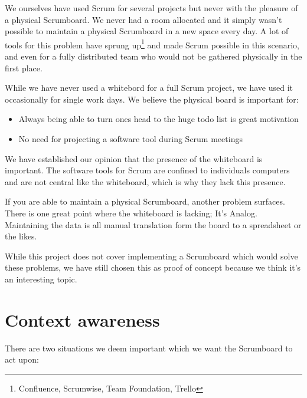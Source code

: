 \documentclass[]{report}
\begin{document}
We ourselves have used Scrum for several projects but never with the pleasure of a physical Scrumboard. We never had a room allocated and it simply wasn't possible to maintain a physical Scrumboard in a new space every day. A lot of tools for this problem have sprung up\footnote{Confluence, Scrumwise, Team Foundation, Trello} and made Scrum possible in this scenario, and even for a fully distributed team who would not be gathered physically in the first place.

While we have never used a whitebord for a full Scrum project, we have used it occasionally for single work days. We believe the physical board is important for:

\begin{itemize}
\item Always being able to turn ones head to the huge todo list is great motivation
\item No need for projecting a software tool during Scrum meetings
\end{itemize}


We have established our opinion that the presence of the whiteboard is important. The software tools for Scrum are confined to individuals computers and are not central like the whiteboard, which is why they lack this presence.

If you are able to maintain a physical Scrumboard, another problem surfaces. There is one great point where the whiteboard is lacking; It's Analog. Maintaining the data is all manual translation form the board to a spreadsheet or the likes.



While this project does not cover implementing a Scrumboard which would solve these problems, we have still chosen this as proof of concept because we think it's an interesting topic.


\section{Context awareness}

There are two situations we deem important which we want the Scrumboard to act upon:
\end{document}
